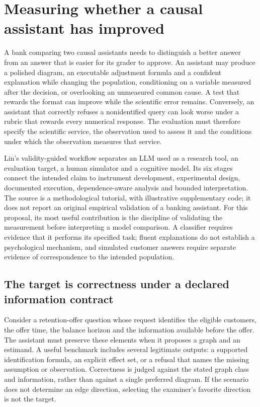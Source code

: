 \section{Measuring whether a causal assistant has improved}
\label{exec20:validity-scope}

A bank comparing two causal assistants needs to distinguish a better answer
from an answer that is easier for its grader to approve. An assistant may
produce a polished diagram, an executable adjustment formula and a confident
explanation while changing the population, conditioning on a variable measured
after the decision, or overlooking an unmeasured common cause. A test that
rewards the format can improve while the scientific error remains. Conversely,
an assistant that correctly refuses a nonidentified query can look worse under
a rubric that rewards every numerical response. The evaluation must therefore
specify the scientific service, the observation used to assess it and the
conditions under which the observation measures that service.

Lin's validity-guided workflow separates an LLM used as a research tool, an
evaluation target, a human simulator and a cognitive model. Its six stages
connect the intended claim to instrument development, experimental design,
documented execution, dependence-aware analysis and bounded interpretation.
The source is a methodological tutorial, with illustrative supplementary code;
it does not report an original empirical validation of a banking assistant.
For this proposal, its most useful contribution is the discipline of validating
the measurement before interpreting a model comparison. A classifier requires
evidence that it performs its specified task; fluent explanations do not
establish a psychological mechanism, and simulated customer answers require
separate evidence of correspondence to the intended population.
\citep{exec20_validity}

\subsection{The target is correctness under a declared information contract}
\label{exec20:validity-target}

Consider a retention-offer question whose request identifies the eligible
customers, the offer time, the balance horizon and the information available
before the offer. The assistant must preserve these elements when it proposes
a graph and an estimand. A useful benchmark includes several legitimate outputs:
a supported identification formula, an explicit effect set, or a refusal that
names the missing assumption or observation. Correctness is judged against the
stated graph class and information, rather than against a single preferred
diagram. If the scenario does not determine an edge direction, selecting the
examiner's favorite direction is not the target.

